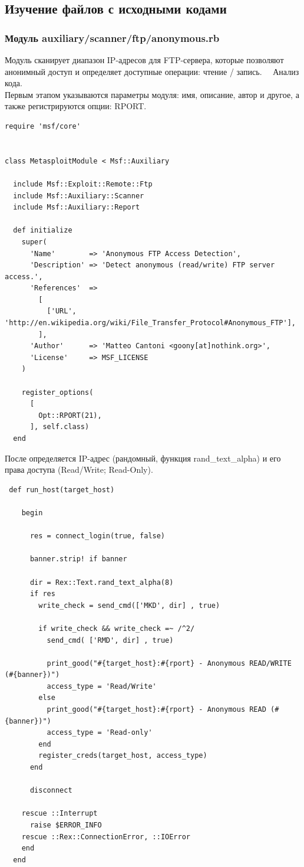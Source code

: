 \documentclass[10pt,a4paper]{report}
\begin{document}
\subsection{Изучение файлов с исходными кодами}
\subsubsection{Модуль auxiliary/scanner/ftp/anonymous.rb}
Модуль сканирует диапазон IP-адресов для FTP-сервера, которые позволяют анонимный доступ и определяет доступные операции: чтение / запись. \
\
Анализ кода.\\
Первым этапом указываются параметры модуля: имя, описание, автор и другое, а также регистрируются опции: RPORT.
\begin{verbatim}
require 'msf/core'


class MetasploitModule < Msf::Auxiliary

  include Msf::Exploit::Remote::Ftp
  include Msf::Auxiliary::Scanner
  include Msf::Auxiliary::Report

  def initialize
    super(
      'Name'        => 'Anonymous FTP Access Detection',
      'Description' => 'Detect anonymous (read/write) FTP server access.',
      'References'  =>
        [
          ['URL', 'http://en.wikipedia.org/wiki/File_Transfer_Protocol#Anonymous_FTP'],
        ],
      'Author'      => 'Matteo Cantoni <goony[at]nothink.org>',
      'License'     => MSF_LICENSE
    )

    register_options(
      [
        Opt::RPORT(21),
      ], self.class)
  end
\end{verbatim}
После определяется IP-адрес (рандомный, функция rand\_text\_alpha) и его права доступа (Read/Write; Read-Only).
\begin{verbatim}
 def run_host(target_host)

    begin

      res = connect_login(true, false)

      banner.strip! if banner

      dir = Rex::Text.rand_text_alpha(8)
      if res
        write_check = send_cmd(['MKD', dir] , true)

        if write_check && write_check =~ /^2/
          send_cmd( ['RMD', dir] , true)

          print_good("#{target_host}:#{rport} - Anonymous READ/WRITE (#{banner})")
          access_type = 'Read/Write'
        else
          print_good("#{target_host}:#{rport} - Anonymous READ (#{banner})")
          access_type = 'Read-only'
        end
        register_creds(target_host, access_type)
      end

      disconnect

    rescue ::Interrupt
      raise $ERROR_INFO
    rescue ::Rex::ConnectionError, ::IOError
    end
  end
\end{verbatim}
\end{document}
